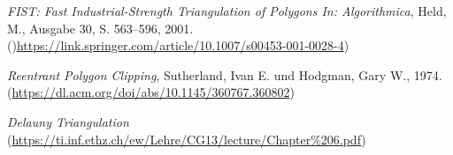 \begin{thebibliography}{11}
    \emph{FIST: Fast Industrial-Strength Triangulation of Polygons In: Algorithmica}, Held, M., Ausgabe 30, S. 563–596, 2001.
    ()\href{https://link.springer.com/article/10.1007/s00453-001-0028-4}{https://link.springer.com/article/10.1007/s00453-001-0028-4})
    
    \emph{Reentrant Polygon Clipping}, Sutherland, Ivan E. und Hodgman, Gary W., 1974. \break
    (\href{https://dl.acm.org/doi/abs/10.1145/360767.360802}{https://dl.acm.org/doi/abs/10.1145/360767.360802})

    \emph{Delauny Triangulation} \break
    (\href{https://ti.inf.ethz.ch/ew/Lehre/CG13/lecture/Chapter%206.pdf}{https://ti.inf.ethz.ch/ew/Lehre/CG13/lecture/Chapter\%206.pdf})
\end{thebibliography}